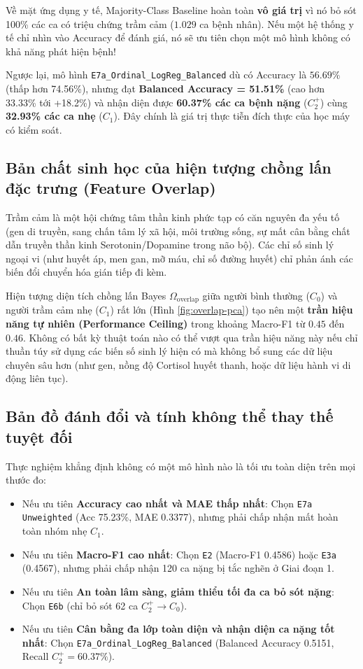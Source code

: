 Về mặt ứng dụng y tế, Majority-Class Baseline hoàn toàn \textbf{vô giá trị} vì nó bỏ sót 100\% các ca có triệu chứng trầm cảm ($1.029$ ca bệnh nhân). Nếu một hệ thống y tế chỉ nhìn vào Accuracy để đánh giá, nó sẽ ưu tiên chọn một mô hình không có khả năng phát hiện bệnh!

Ngược lại, mô hình \texttt{E7a\_Ordinal\_LogReg\_Balanced} dù có Accuracy là $56.69\%$ (thấp hơn 74.56\%), nhưng đạt \textbf{Balanced Accuracy = 51.51\%} (cao hơn 33.33\% tới +18.2\%) và nhận diện được \textbf{60.37\% các ca bệnh nặng} ($C_2^+$) cùng \textbf{32.93\% các ca nhẹ} ($C_1$). Đây chính là giá trị thực tiễn đích thực của học máy có kiểm soát.

\subsection{Bản chất sinh học của hiện tượng chồng lấn đặc trưng (Feature Overlap)}
Trầm cảm là một hội chứng tâm thần kinh phức tạp có căn nguyên đa yếu tố (gen di truyền, sang chấn tâm lý xã hội, môi trường sống, sự mất cân bằng chất dẫn truyền thần kinh Serotonin/Dopamine trong não bộ). Các chỉ số sinh lý ngoại vi (như huyết áp, men gan, mỡ máu, chỉ số đường huyết) chỉ phản ánh các biến đổi chuyển hóa gián tiếp đi kèm. 

Hiện tượng diện tích chồng lấn Bayes $\Omega_{\text{overlap}}$ giữa người bình thường ($C_0$) và người trầm cảm nhẹ ($C_1$) rất lớn (Hình \ref{fig:overlap-pca}) tạo nên một \textbf{trần hiệu năng tự nhiên (Performance Ceiling)} trong khoảng Macro-F1 từ $0.45$ đến $0.46$. Không có bất kỳ thuật toán nào có thể vượt qua trần hiệu năng này nếu chỉ thuần túy sử dụng các biến số sinh lý hiện có mà không bổ sung các dữ liệu chuyên sâu hơn (như gen, nồng độ Cortisol huyết thanh, hoặc dữ liệu hành vi di động liên tục).

\subsection{Bản đồ đánh đổi và tính không thể thay thế tuyệt đối}
Thực nghiệm khẳng định không có một mô hình nào là tối ưu toàn diện trên mọi thước đo:
\begin{itemize}
    \item Nếu ưu tiên \textbf{Accuracy cao nhất và MAE thấp nhất}: Chọn \texttt{E7a Unweighted} (Acc 75.23\%, MAE 0.3377), nhưng phải chấp nhận mất hoàn toàn nhóm nhẹ $C_1$.
    \item Nếu ưu tiên \textbf{Macro-F1 cao nhất}: Chọn \texttt{E2} (Macro-F1 0.4586) hoặc \texttt{E3a} (0.4567), nhưng phải chấp nhận 120 ca nặng bị tắc nghẽn ở Giai đoạn 1.
    \item Nếu ưu tiên \textbf{An toàn lâm sàng, giảm thiểu tối đa ca bỏ sót nặng}: Chọn \texttt{E6b} (chỉ bỏ sót 62 ca $C_2^+ \to C_0$).
    \item Nếu ưu tiên \textbf{Cân bằng đa lớp toàn diện và nhận diện ca nặng tốt nhất}: Chọn \texttt{E7a\_Ordinal\_LogReg\_Balanced} (Balanced Accuracy 0.5151, Recall $C_2^+ = 60.37\%$).
\end{itemize}

